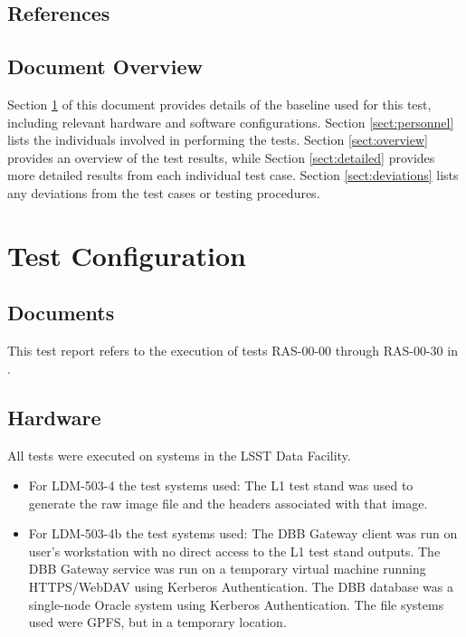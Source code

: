 \documentclass[DM,lsstdraft,STR,toc]{lsstdoc}
\begin{document}
\subsection{References}
\label{sect:references}

\renewcommand{\refname}{}


\subsection{Document Overview}
\label{sect:docoverview}

Section \ref{sect:configuration} of this document provides details of the \product{} baseline used for this test, including relevant hardware and software configurations.
Section \ref{sect:personnel} lists the individuals involved in performing the tests.
Section \ref{sect:overview} provides an overview of the test results, while Section \ref{sect:detailed} provides more detailed results from each individual test case.
Section \ref{sect:deviations} lists any deviations from the test cases or testing procedures.

\section{Test Configuration}
\label{sect:configuration}

\subsection{Documents}

This test report refers to the execution of tests RAS-00-00 through RAS-00-30 in .

\subsection{Hardware}
\label{sect:hwconf}

All tests were executed on systems in the LSST Data Facility.

\begin{itemize} 
\item{
For LDM-503-4 the test systems used:
The L1 test stand was used to generate the raw image file and the headers associated with that image.  
}
\item {
For LDM-503-4b the test systems used: 
The DBB Gateway client was run on user's workstation with no direct access to the L1 test stand outputs.
The DBB Gateway service was run on a temporary virtual machine running HTTPS/WebDAV using Kerberos Authentication.
The DBB database was a single-node Oracle system using Kerberos Authentication.
The file systems used were GPFS, but in a temporary location.   
}
\end{itemize}
\end{document}
